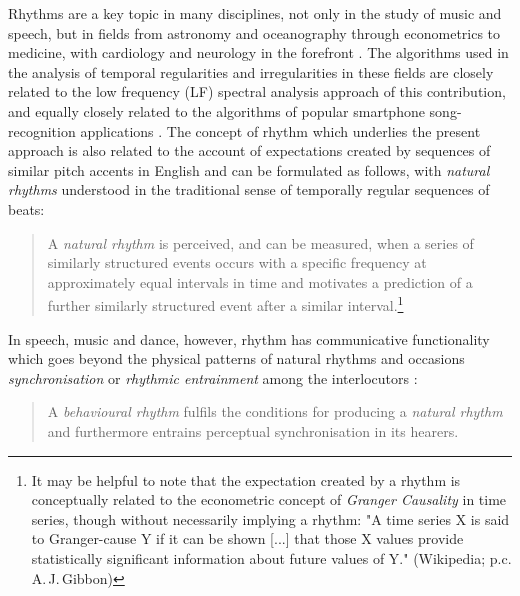 \documentclass[output=paper,colorlinks,citecolor=brown
]{langscibook}
\begin{document}
Rhythms are a key topic in many disciplines, not only in the study of music and speech, but in fields from astronomy and oceanography through econometrics to medicine, with cardiology and neurology in the forefront \cite{lewalterluederitz2010, huangetal1998}. The algorithms used in the analysis of temporal regularities and irregularities in these fields are closely related to the low frequency (LF) spectral analysis approach of this contribution, and equally closely related to the algorithms of popular smartphone song-recognition applications \cite{wangshazam2003}. The concept of rhythm which underlies the present approach is also related to the account of expectations created by sequences of similar pitch accents in English \cite{dilley2005} and can be formulated as follows, with \textit{natural rhythms} understood in the traditional sense of temporally regular sequences of beats:

\begin{quotation}
\noindent A \textit{natural rhythm} is perceived, and can be measured, when a series of similarly structured events occurs with a specific frequency at approximately equal intervals in time and motivates a prediction of a further similarly structured event after a similar interval.\footnote{It may be helpful to note that the expectation created by a rhythm is conceptually related to the econometric concept of \textit{Granger Causality} in time series, though without necessarily implying a rhythm: "A time series X is said to Granger-cause Y if it can be shown [...] that those X values provide statistically significant information about future values of Y." (Wikipedia; p.c. A.\,J.\,Gibbon)}
\end{quotation}

In speech, music and dance, however, rhythm has communicative functionality which goes beyond the physical patterns of natural rhythms and occasions \textit{synchronisation} or \textit{rhythmic entrainment} among the interlocutors \cite{cumminsport1998, indenmaliszwagnerwachsmuth2012, rathckeetaltapping2021}:

\begin{quotation}
\noindent A \textit{behavioural rhythm} fulfils the conditions for producing a \textit{natural rhythm} and furthermore entrains perceptual synchronisation in its hearers.
\end{quotation}
\end{document}
